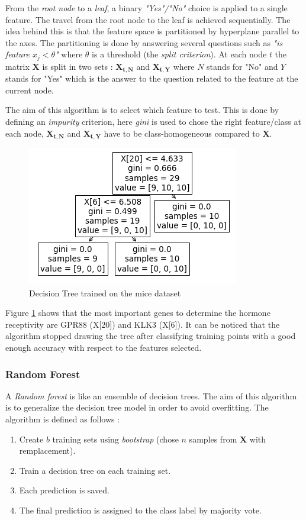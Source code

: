 \documentclass[10pt,conference,compsocconf]{IEEEtran}
\begin{document}
From the \emph{root node} to a \emph{leaf}, a binary \emph{"Yes"/"No"} choice is applied to a single feature. The travel from the root node to the leaf is achieved sequentially. The idea behind this is that the feature space is partitioned by hyperplane parallel to the axes. The partitioning is done by answering several questions such as \emph{"is feature $x_j < \theta$"} where $\theta$ is a threshold (the \emph{split criterion}). At each node $t$ the matrix $\mathbf{X}$ is split in two sets : $\mathbf{X_{t, N}}$ and $\mathbf{X_{t, Y}}$ where $N$ stands for "No" and $Y$ stands for "Yes" which is the answer to the question related to the feature at the current node. \cite{ml_python}

The aim of this algorithm is to select which feature to test. This is done by defining an \emph{impurity} criterion, here \emph{gini} is used to chose the right feature/class at each node, $\mathbf{X_{t, N}}$ and $\mathbf{X_{t, Y}}$ have to be class-homogeneous compared to $\mathbf{X}$.

\begin{figure}[H]
    \centering
    \includegraphics[width=0.6\columnwidth]{figures/dt_plot.png}
    \caption{Decision Tree trained on the mice dataset}
    \label{fig:decision_tree}
\end{figure}

Figure \ref{fig:decision_tree} shows that the most important genes to determine the hormone receptivity are GPR88 (X[20]) and KLK3 (X[6]). It can be noticed that the algorithm stopped drawing the tree after classifying training points with a good enough accuracy with respect to the features selected.

\subsubsection{Random Forest}
A \emph{Random forest} is like an ensemble of decision trees. The aim of this algorithm is to generalize the decision tree model in order to avoid overfitting. The algorithm is defined as follows :
\begin{enumerate}
    \item Create $b$ training sets using \emph{bootstrap} (chose $n$ samples from $\mathbf{X}$ with remplacement).
    \item Train a decision tree on each training set.
    \item Each prediction is saved.
    \item The final prediction is assigned to the class label by majority vote.
\end{enumerate}
\end{document}

